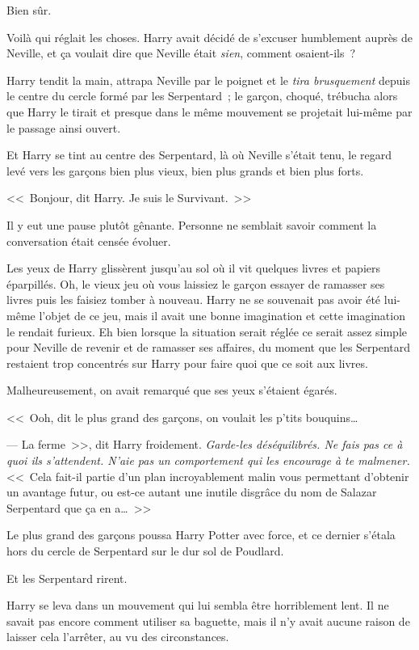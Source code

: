 Bien sûr.

Voilà qui réglait les choses. Harry avait décidé de s'excuser humblement auprès de Neville, et ça voulait dire que Neville était \emph{sien}, comment osaient-ils~?

Harry tendit la main, attrapa Neville par le poignet et le \emph{tira brusquement} depuis le centre du cercle formé par les Serpentard~; le garçon, choqué, trébucha alors que Harry le tirait et presque dans le même mouvement se projetait lui-même par le passage ainsi ouvert.

Et Harry se tint au centre des Serpentard, là où Neville s'était tenu, le regard levé vers les garçons bien plus vieux, bien plus grands et bien plus forts.

<<~Bonjour, dit Harry. Je suis le Survivant.~>>

Il y eut une pause plutôt gênante. Personne ne semblait savoir comment la conversation était censée évoluer.

Les yeux de Harry glissèrent jusqu'au sol où il vit quelques livres et papiers éparpillés. Oh, le vieux jeu où vous laissiez le garçon essayer de ramasser ses livres puis les faisiez tomber à nouveau. Harry ne se souvenait pas avoir été lui-même l'objet de ce jeu, mais il avait une bonne imagination et cette imagination le rendait furieux. Eh bien lorsque la situation serait réglée ce serait assez simple pour Neville de revenir et de ramasser ses affaires, du moment que les Serpentard restaient trop concentrés sur Harry pour faire quoi que ce soit aux livres.

Malheureusement, on avait remarqué que ses yeux s'étaient égarés.

<<~Ooh, dit le plus grand des garçons, on voulait les p'tits bouquins…

--- La ferme~>>, dit Harry froidement. \emph{Garde-les déséquilibrés. Ne fais pas ce à quoi ils s'attendent. N'aie pas un comportement qui les encourage à te malmener.} <<~Cela fait-il partie d'un plan incroyablement malin vous permettant d'obtenir un avantage futur, ou est-ce autant une inutile disgrâce du nom de Salazar Serpentard que ça en a…~>>

Le plus grand des garçons poussa Harry Potter avec force, et ce dernier s'étala hors du cercle de Serpentard sur le dur sol de Poudlard.

Et les Serpentard rirent.

Harry se leva dans un mouvement qui lui sembla être horriblement lent. Il ne savait pas encore comment utiliser sa baguette, mais il n'y avait aucune raison de laisser cela l'arrêter, au vu des circonstances.

